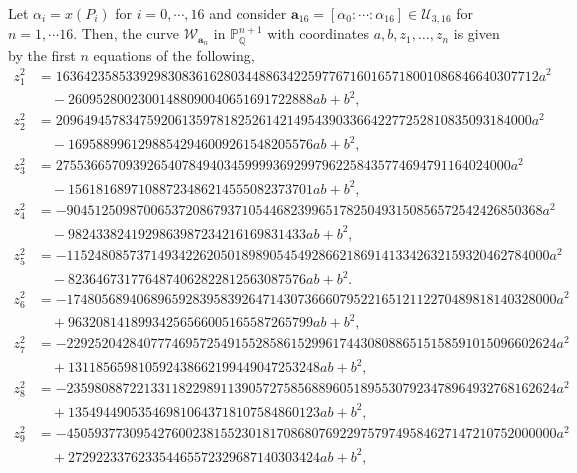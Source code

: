 \documentclass[11pt, a4paper]{amsart}
\theoremstyle{definition}
\newcommand{\Q}{\mathbb{Q}}
\newcommand{\Pp}{\mathbb{P}}
\newcommand{\Uc}{\mathcal{U}}
\newcommand{\Wc}{\mathcal{W}}
\newcommand{\ba}{\mathbf{a}}
\begin{document}
\iffalse

Let  $\alpha_i= x(P_i)$    for $i=0,\cdots, 16$ and consider $\ba_{16}=  [\alpha_0: \cdots : \alpha_{16}] \in \Uc_{3,16}$ for $n=1,\cdots 16.$  Then, 
the   curve $\Wc_{\ba_n}$ in $\Pp_\Q^{n+1}$ with coordinates $a, b, z_1, \ldots, z_n$  is given by the first $n$ equations of the following,
{\small
	\begin{align*}
		z_1^2 & = 163642358533929830836162803448863422597767160165718001086846640307712a^2\\
		& \quad 	-26095280023001488090040651691722888 ab +b^2, \\     
		z_2^2 & = 20964945783475920613597818252614214954390336642277252810835093184000 a^2\\
		& \quad -16958899612988542946009261548205576 ab +b^2, \\
		z_3^2 & = 27553665709392654078494034599993692997962258435774694791164024000 a^2\\
		& \quad-15618168971088723486214555082373701 ab +b^2, \\
		z_4^2 & = -90451250987006537208679371054468239965178250493150856572542426850368a^2\\
		& \quad-9824338241929863987234216169831433 ab +b^2, \\
		z_5^2 & = -115248085737149342262050189890545492866218691413342632159320462784000 a^2\\
		& \quad-8236467317764874062822812563087576 ab +b^2.  \\
		z_6^2 & = -1748056894068965928395839264714307366607952216512112270489818140328000 a^2\\
		& \quad+96320814189934256566005165587265799 ab +b^2,  \\
		z_7^2 & = -2292520428407774695725491552858615299617443080886515158591015096602624 a^2\\
		& \quad +131185659810592438662199449047253248 ab+b^2, \\
		z_8^2 & = -2359808872213311822989113905727585688960518955307923478964932768162624 a^2\\
		& \quad +135494490535469810643718107584860123 ab +b^2, \\
		z_9^2 & =-4505937730954276002381552301817086807692297579749584627147210752000000 a^2 \\
		& \quad+272922337623354465572329687140303424 ab +b^2, \\

\end{align*}}
\end{document}
